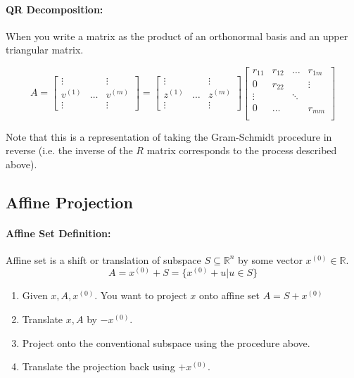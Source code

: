 \documentclass[a4paper,12pt]{report}
\def\reals{\mathbb{R}}
\begin{document}
\paragraph{QR Decomposition: } When you write a matrix as the product of an orthonormal basis and an upper triangular matrix.

\begin{equation}
A = \begin{bmatrix}
\vdots & & \vdots \\
v^{(1)} & \dots & v^{(m)} \\
\vdots & & \vdots
\end{bmatrix} = 
\begin{bmatrix}
\vdots & & \vdots \\
z^{(1)} & \dots & z^{(m)} \\
\vdots & & \vdots
\end{bmatrix}
\begin{bmatrix}
r_{11} & r_{12} & \dots & r_{1m} \\
0 & r_{22} & & \vdots \\
\vdots & & \ddots & \\
0 & \dots & & r_{mm} \\
\end{bmatrix}
\end{equation}

Note that this is a representation of taking the Gram-Schmidt procedure in reverse (i.e. the inverse of the $R$ matrix corresponds to the process described above).

\subsection{Affine Projection}

\paragraph{Affine Set Definition: } Affine set is a shift or translation of subspace $S \subseteq \reals^n$ by some vector $x^{(0)} \in \reals$. $$A = x^{(0)} + S = \{x^{(0)} + u | u\in S\}$$

\begin{enumerate}
\item Given $x,A, x^{(0)}$. You want to project $x$ onto affine set $A = S + x^{(0)}$
\item Translate $x, A$ by $-x^{(0)}$.
\item Project onto the conventional subspace using the procedure above.
\item Translate the projection back using $+x^{(0)}$.
\end{enumerate}
\end{document}

